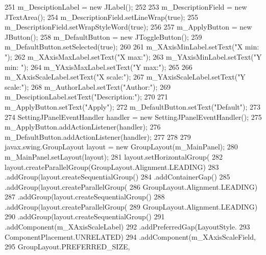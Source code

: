 \begin{DoxyCode}
251         m\_DesciptionLabel = \textcolor{keyword}{new} JLabel();
252         
253         m\_DescriptionField = \textcolor{keyword}{new} JTextArea();
254         m\_DescriptionField.setLineWrap(\textcolor{keyword}{true});
255         m\_DescriptionField.setWrapStyleWord(\textcolor{keyword}{true});
256         
257         m\_ApplyButton = \textcolor{keyword}{new} JButton();
258         m\_DefaultButton = \textcolor{keyword}{new} JToggleButton();
259         m\_DefaultButton.setSelected(\textcolor{keyword}{true});
260 
261         m\_XAxisMinLabel.setText(\textcolor{stringliteral}{"X min: "});
262         m\_XAxisMaxLabel.setText(\textcolor{stringliteral}{"X max:"});
263         m\_YAxisMinLabel.setText(\textcolor{stringliteral}{"Y min: "});
264         m\_YAxisMaxLabel.setText(\textcolor{stringliteral}{"Y max:"});
265 
266         m\_XAxisScaleLabel.setText(\textcolor{stringliteral}{"X scale:"});
267         m\_YAxisScaleLabel.setText(\textcolor{stringliteral}{"Y scale:"});
268         m\_AuthorLabel.setText(\textcolor{stringliteral}{"Author:"});
269         m\_DesciptionLabel.setText(\textcolor{stringliteral}{"Description:"});
270 
271         m\_ApplyButton.setText(\textcolor{stringliteral}{"Apply"});
272         m\_DefaultButton.setText(\textcolor{stringliteral}{"Default"});
273         
274         SettingJPanelEventHandler handler = \textcolor{keyword}{new} SettingJPanelEventHandler();
275         m\_ApplyButton.addActionListener(handler);
276         m\_DefaultButton.addActionListener(handler);
277         
278 
279         javax.swing.GroupLayout layout = \textcolor{keyword}{new} GroupLayout(m\_MainPanel);
280         m\_MainPanel.setLayout(layout);
281         layout.setHorizontalGroup(
282             layout.createParallelGroup(GroupLayout.Alignment.LEADING)
283             .addGroup(layout.createSequentialGroup()
284                 .addContainerGap()
285                 .addGroup(layout.createParallelGroup(
286                         GroupLayout.Alignment.LEADING)
287                     .addGroup(layout.createSequentialGroup()
288                         .addGroup(layout.createParallelGroup(
289                                 GroupLayout.Alignment.LEADING)
290                             .addGroup(layout.createSequentialGroup()
291                                 .addComponent(m\_XAxisScaleLabel)
292                                 .addPreferredGap(LayoutStyle.
293                                         ComponentPlacement.UNRELATED)
294                                 .addComponent(m\_XAxisScaleField, 
295                                         GroupLayout.PREFERRED\_SIZE, 

\end{DoxyCode}
